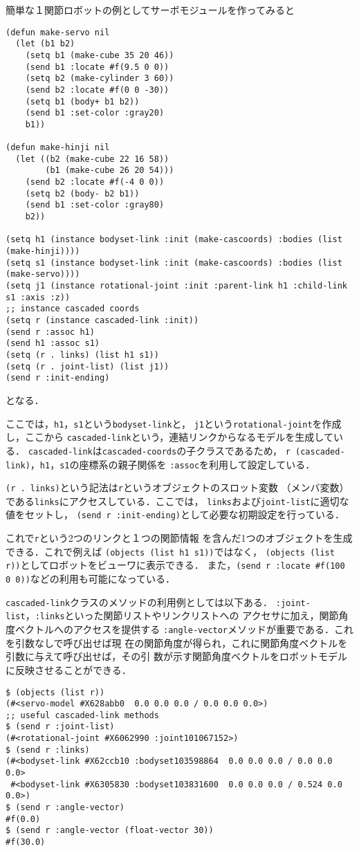簡単な１関節ロボットの例としてサーボモジュールを作ってみると
{\baselineskip=10pt
\begin{verbatim}
(defun make-servo nil
  (let (b1 b2)
    (setq b1 (make-cube 35 20 46))
    (send b1 :locate #f(9.5 0 0))
    (setq b2 (make-cylinder 3 60))
    (send b2 :locate #f(0 0 -30))
    (setq b1 (body+ b1 b2))
    (send b1 :set-color :gray20)
    b1))

(defun make-hinji nil
  (let ((b2 (make-cube 22 16 58))
        (b1 (make-cube 26 20 54)))
    (send b2 :locate #f(-4 0 0))
    (setq b2 (body- b2 b1))
    (send b1 :set-color :gray80)
    b2))

(setq h1 (instance bodyset-link :init (make-cascoords) :bodies (list (make-hinji))))
(setq s1 (instance bodyset-link :init (make-cascoords) :bodies (list (make-servo))))
(setq j1 (instance rotational-joint :init :parent-link h1 :child-link s1 :axis :z))
;; instance cascaded coords
(setq r (instance cascaded-link :init))
(send r :assoc h1)
(send h1 :assoc s1)
(setq (r . links) (list h1 s1))
(setq (r . joint-list) (list j1))
(send r :init-ending)
\end{verbatim}
}

となる．

ここでは，\verb|h1|，\verb|s1|という\verb|bodyset-link|と，
\verb|j1|という\verb|rotational-joint|を作成し，ここから
\verb|cascaded-link|という，連結リンクからなるモデルを生成している．
\verb|cascaded-link|は\verb|cascaded-coords|の子クラスであるため，
\verb|r (cascaded-link)|，\verb|h1|，\verb|s1|の座標系の親子関係を
\verb|:assoc|を利用して設定している．

\verb|(r . links)|という記法は\verb|r|というオブジェクトのスロット変数
     （メンバ変数）である\verb|links|にアクセスしている．ここでは，
\verb|links|および\verb|joint-list|に適切な値をセットし，
\verb|(send r :init-ending)|として必要な初期設定を行っている．

これで\verb|r|という2つのリンクと１つの関節情報
を含んだ1つのオブジェクトを生成できる．これで例えば
\verb|(objects (list h1 s1))|ではなく，
\verb|(objects (list r))|としてロボットをビューワに表示できる．
また，\verb|(send r :locate #f(100 0 0))|などの利用も可能になっている．

\verb|cascaded-link|クラスのメソッドの利用例としては以下ある．
\verb|:joint-list|，\verb|:links|といった関節リストやリンクリストへの
アクセサに加え，関節角度ベクトルへのアクセスを提供する
\verb|:angle-vector|メソッドが重要である．これを引数なしで呼び出せば現
在の関節角度が得られ，これに関節角度ベクトルを引数に与えて呼び出せば，その引
数が示す関節角度ベクトルをロボットモデルに反映させることができる．
{\baselineskip=10pt
\begin{verbatim}
$ (objects (list r))
(#<servo-model #X628abb0  0.0 0.0 0.0 / 0.0 0.0 0.0>)
;; useful cascaded-link methods
$ (send r :joint-list)
(#<rotational-joint #X6062990 :joint101067152>)
$ (send r :links)
(#<bodyset-link #X62ccb10 :bodyset103598864  0.0 0.0 0.0 / 0.0 0.0 0.0>
 #<bodyset-link #X6305830 :bodyset103831600  0.0 0.0 0.0 / 0.524 0.0 0.0>)
$ (send r :angle-vector)
#f(0.0)
$ (send r :angle-vector (float-vector 30))
#f(30.0)
\end{verbatim}
}

